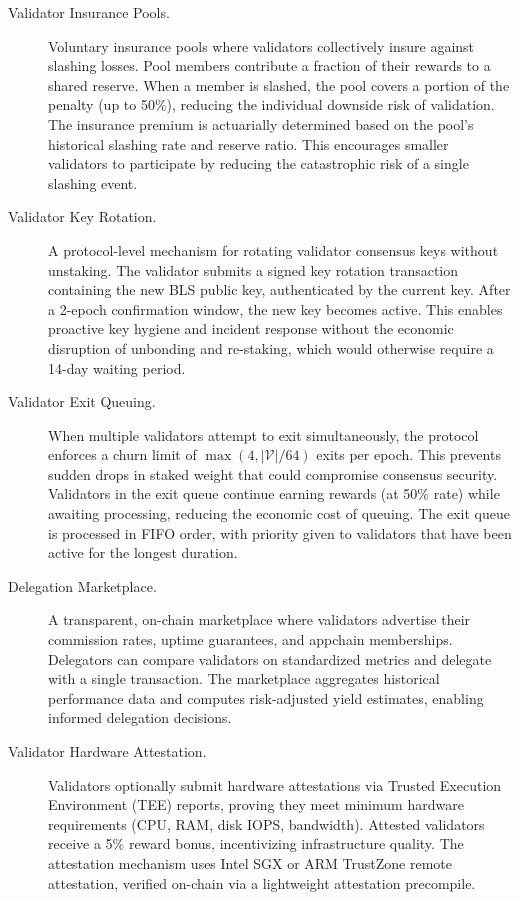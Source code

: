 \begin{description}
    \item[Validator Insurance Pools.] Voluntary insurance pools where validators collectively insure against slashing losses. Pool members contribute a fraction of their rewards to a shared reserve. When a member is slashed, the pool covers a portion of the penalty (up to 50\%), reducing the individual downside risk of validation. The insurance premium is actuarially determined based on the pool's historical slashing rate and reserve ratio. This encourages smaller validators to participate by reducing the catastrophic risk of a single slashing event.

    \item[Validator Key Rotation.] A protocol-level mechanism for rotating validator consensus keys without unstaking. The validator submits a signed key rotation transaction containing the new BLS public key, authenticated by the current key. After a 2-epoch confirmation window, the new key becomes active. This enables proactive key hygiene and incident response without the economic disruption of unbonding and re-staking, which would otherwise require a 14-day waiting period.

    \item[Validator Exit Queuing.] When multiple validators attempt to exit simultaneously, the protocol enforces a churn limit of $\max(4, |\mathcal{V}| / 64)$ exits per epoch. This prevents sudden drops in staked weight that could compromise consensus security. Validators in the exit queue continue earning rewards (at 50\% rate) while awaiting processing, reducing the economic cost of queuing. The exit queue is processed in FIFO order, with priority given to validators that have been active for the longest duration.

    \item[Delegation Marketplace.] A transparent, on-chain marketplace where validators advertise their commission rates, uptime guarantees, and appchain memberships. Delegators can compare validators on standardized metrics and delegate with a single transaction. The marketplace aggregates historical performance data and computes risk-adjusted yield estimates, enabling informed delegation decisions.

    \item[Validator Hardware Attestation.] Validators optionally submit hardware attestations via Trusted Execution Environment (TEE) reports, proving they meet minimum hardware requirements (CPU, RAM, disk IOPS, bandwidth). Attested validators receive a 5\% reward bonus, incentivizing infrastructure quality. The attestation mechanism uses Intel SGX or ARM TrustZone remote attestation, verified on-chain via a lightweight attestation precompile.
\end{description}

